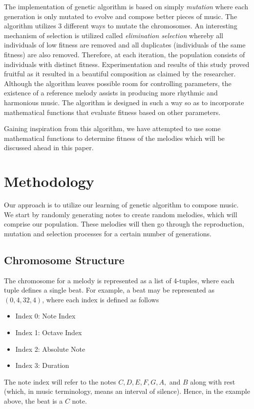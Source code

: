 \documentclass[conference]{IEEEtran}
\begin{document}
The implementation of genetic algorithm is based on simply \textit{mutation} where each generation is only mutated to evolve and compose better pieces of music. The algorithm utilizes 3 different ways to mutate the chromosomes. An interesting mechanism of selection is utilized called \textit{elimination selection} whereby all individuals of low fitness are removed and all duplicates (individuals of the same fitness) are also removed. Therefore, at each iteration, the population consists of individuals with distinct fitness. Experimentation and results of this study proved fruitful as it resulted in a beautiful composition as claimed by the researcher. Although the algorithm leaves possible room for controlling parameters, the existence of a reference melody assists in producing more rhythmic and harmonious music. The algorithm is designed in such a way so as to incorporate mathematical functions that evaluate fitness based on other parameters.

Gaining inspiration from this algorithm, we have attempted to use some mathematical functions to determine fitness of the melodies which will be discussed ahead in this paper.

\section{Methodology}
Our approach is to utilize our learning of genetic algorithm to compose music. We start by randomly generating notes to create random melodies, which will comprise our population. These melodies will then go through the reproduction, mutation and selection processes for a certain number of generations.

\subsection{Chromosome Structure}
The chromosome for a melody is represented as a list of 4-tuples, where each tuple defines a single beat. For example, a beat may be represented as $(0, 4, 32, 4)$, where each index is defined as follows
\begin{itemize}
	\item Index 0: Note Index
	\item Index 1: Octave Index
	\item Index 2: Absolute Note
	\item Index 3: Duration
\end{itemize}

The note index will refer to the notes $C, D, E, F, G, A,$ and $B$ along with rest (which, in music terminology, means an interval of silence). Hence, in the example above, the beat is a $C$ note.
\end{document}
